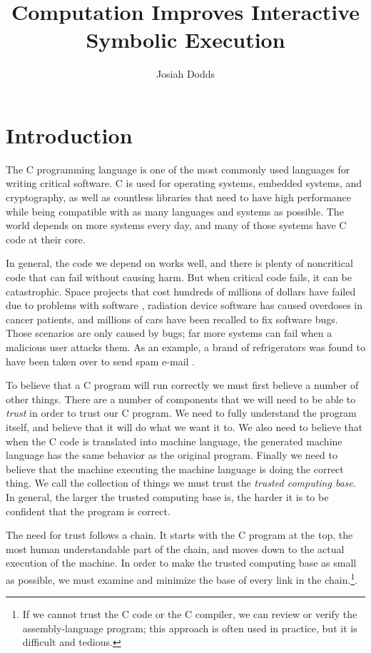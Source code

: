 \documentclass{puthesis}
\author{Josiah Dodds}
\title{Computation Improves Interactive Symbolic Execution}
\begin{document}
\chapter{Introduction}

The C programming language is one of the most commonly used languages
for writing critical software. C is used for operating systems,
embedded systems, and cryptography, as well as countless libraries
that need to have high performance while being compatible with as many
languages and systems as possible. The world depends on more systems
every day, and many of those systems have C code at their core.

In general, the code we depend on works well, and there is plenty of
noncritical code that can fail without causing harm.  But when critical
code fails, it can be catastrophic. Space projects that cost hundreds
of millions of dollars have failed due to problems with software
\cite{polarlander, marsorbit}, radiation device software has caused
overdoses in cancer patients\cite{therac}, and millions of cars have
been recalled to fix software bugs\cite{toyotarecall}. Those scenarios
are only caused by bugs; far more systems can fail when a malicious
user attacks them. As an example, a brand of refrigerators was found
to have been taken over to send spam e-mail \cite{fridgenet}.

To believe that a C program will run correctly we must first believe a
number of other things. There are a number of components that we will
need to be able to \emph{trust} in order to trust our C program. We need
to fully understand the program itself, and believe that it will do
what we want it to. We also need to believe that when
the C code is translated into machine language, the generated machine
language has the same behavior as the original program. Finally we
need to believe that the machine executing the machine language is
doing the correct thing. We call the collection of things we must
trust the \emph{trusted computing base}. In general, the larger the
trusted computing base is, the harder it is to be confident that the
program is correct.

The need for trust follows a chain. It starts with the C program at
the top, the most human understandable part of the chain, and moves
down to the actual execution of the machine. In order to make the
trusted computing base as small as possible, we must examine and minimize the base of every link in the chain.\footnote{If we cannot trust
  the C code or the C compiler, we can review or verify the
  assembly-language program; this approach is often used in practice,
  but it is difficult and tedious.}.
\end{document}
